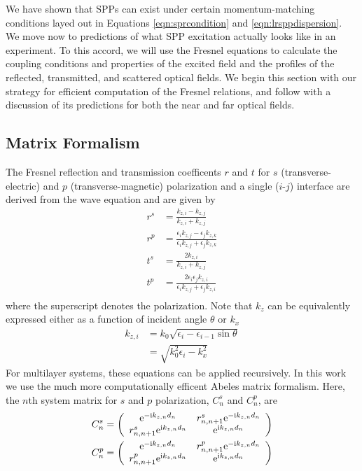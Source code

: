 We have shown that SPPs can exist under certain momentum-matching
conditions layed out in Equations \ref{eqn:sprcondition} and
\ref{eqn:lrsppdispersion}.  We move now to predictions of what SPP
excitation actually looks like in an experiment.  To this accord, we will
use the Fresnel equations to calculate the coupling conditions and
properties of the excited field and the profiles of the reflected,
transmitted, and scattered optical fields.   We begin this section with our
strategy for efficient computation of the Fresnel relations, and follow
with a discussion of its predictions for both the near and far optical
fields. 

\subsection{Matrix Formalism}
The Fresnel reflection and transmission coefficents $r$ and $t$ for $s$
(transverse-electric) and $p$ (transverse-magnetic) polarization and a
single ($i$-$j$) interface are derived from the wave equation and are given
by
\begin{align}
r^s &= \frac{k_{z,i}-k_{z,j}}{k_{z,i}+k_{z,j}}\\
r^p &= \frac{\epsilon_i k_{z,j} - \epsilon_j k_{z,k}}{\epsilon_i k_{z,j} + \epsilon_j k_{z,k}} \\
t^s &= \frac{2 k_{z,i}}{k_{z,i}+k_{z,j}}\\
t^p &= \frac{2 \epsilon_i \epsilon_j k_{z,i}}{\epsilon_i k_{z,j} + \epsilon_j k_{z,i}}\\
\end{align}
where the superscript denotes the polarization.
Note that $k_{z}$ can be equivalently expressed either as a
function of incident angle $\theta$ or $k_x$
\begin{align}
 k_{z,i} &= k_0 \sqrt{\epsilon_i - \epsilon_{i-1} \sin \theta}\\
&= \sqrt{k_0^2\epsilon_i - k_x^2}
\end{align}
For multilayer systems, these equations can be applied recursively. In 
this work we use the much more computationally efficent 
Abeles matrix formalism.  Here, the $n$th system matrix for $s$ and $p$
polarization, $C^s_n$ and $C^p_n$, are
\begin{align}
C^s_n = \left(\begin{array}{cc}
{\mathrm{e}}^{-{\mathrm{i}} k_{z,n} d_n} & r^s_{n,n+1} {\mathrm{e}}^{-{\mathrm{i}} k_{z,n} d_n} \\
r^s_{n,n+1} {\mathrm{e}}^{{\mathrm{i}} k_{z,n} d_n} & {\mathrm{e}}^{{\mathrm{i}} k_{z,n} d_n} 
\end{array}\right)\\
C^p_n = \left(\begin{array}{cc}
{\mathrm{e}}^{-{\mathrm{i}} k_{z,n} d_n} & r^p_{n,n+1} {\mathrm{e}}^{-{\mathrm{i}} k_{z,n} d_n} \\
r^p_{n,n+1} {\mathrm{e}}^{{\mathrm{i}} k_{z,n} d_n} & {\mathrm{e}}^{{\mathrm{i}} k_{z,n} d_n} 
\end{array}\right)
\end{align}
